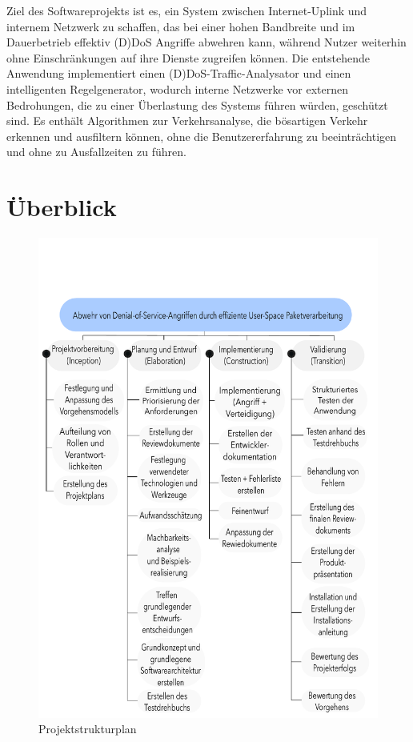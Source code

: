 \documentclass[../review_2.tex]{subfiles}
\begin{document}
    Ziel des Softwareprojekts ist es, ein System zwischen Internet-Uplink und internem Netzwerk zu schaffen, das bei einer hohen Bandbreite und im Dauerbetrieb effektiv (D)DoS Angriffe abwehren kann, während Nutzer weiterhin ohne Einschränkungen auf ihre Dienste zugreifen können. Die entstehende Anwendung implementiert einen (D)DoS-Traffic-Analysator und einen intelligenten Regelgenerator, wodurch interne Netzwerke vor externen Bedrohungen, die zu einer Überlastung des Systems führen würden, geschützt sind. Es enthält Algorithmen zur Verkehrsanalyse, die bösartigen Verkehr erkennen und ausfiltern können, ohne die Benutzererfahrung zu beeinträchtigen und ohne zu Ausfallzeiten zu führen.
    
    \section{Überblick}
    
    \begin{figure}[H]
        \centering
        \includegraphics[width=0.85\linewidth]{img/projektstrukturplan.pdf}
        \caption{Projektstrukturplan}
        \label{projektstrukturplan}
    \end{figure}
    
\end{document}
